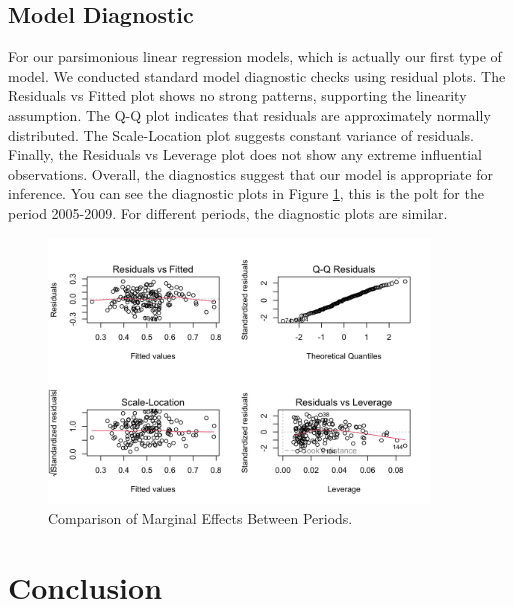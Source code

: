 \documentclass[11pt, a4paper]{article} %
\begin{document}
\subsection{Model Diagnostic}
For our parsimonious linear regression models, which is actually our first type of model. We conducted standard model diagnostic checks using residual 
plots. The Residuals vs Fitted plot shows no strong patterns, supporting the linearity assumption. The Q-Q plot indicates that residuals are 
approximately normally distributed. The Scale-Location plot suggests constant variance of residuals. Finally, the Residuals vs Leverage plot does not 
show any extreme influential observations. Overall, the diagnostics suggest that our model is appropriate for inference. You can see the diagnostic plots 
in Figure \ref{fig:diagnostic_plots}, this is the polt for the period 2005-2009. For different periods, the diagnostic plots are similar.
\begin{figure}[htbp]
    \centering
    \includegraphics[width=0.9\textwidth]{figure/diagnostic_plots_mydf_2005_2009.png}
    \caption{Comparison of Marginal Effects Between Periods.}
    \label{fig:diagnostic_plots}
\end{figure}



\section{Conclusion}

\end{document}
